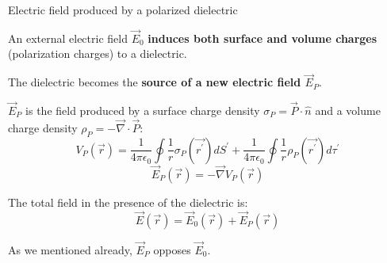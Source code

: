 %
%
%

\begin{frame}{Electric field produced by a polarized dielectric}

An external electric field $\vec{E}_{0}$
{\bf induces both surface and volume charges} (polarization charges) to a dielectric.\\
\vspace{0.2cm}

The dielectric becomes the {\bf source of a new electric field $\vec{E}_{P}$}.\\
\vspace{0.2cm}

$\vec{E}_{P}$ is the field produced by a surface charge density
$\sigma_P = \vec{P} \cdot \hat{n}$ and a volume charge density $\rho_P = - \vec{\nabla} \cdot \vec{P}$:
\begin{equation*}
 V_P(\vec{r}) = \frac{1}{4\pi\epsilon_0} \oint \frac{1}{r} {\sigma}_P(\vec{r^{\prime}}) dS^{\prime} +
                \frac{1}{4\pi\epsilon_0} \oint \frac{1}{r} {\rho}_P(\vec{r^{\prime}}) d\tau^{\prime}
\end{equation*}
\begin{equation*}
 \vec{E}_{P}(\vec{r}) = - \vec{\nabla} V_P(\vec{r})
\end{equation*}

The total field in the presence of the dielectric is:
\begin{equation*}
 \vec{E}(\vec{r}) = \vec{E}_{0}(\vec{r}) + \vec{E}_{P}(\vec{r})
\end{equation*}

As we mentioned already, $\vec{E}_{P}$ opposes $\vec{E}_{0}$.

\end{frame}

%
%
%

